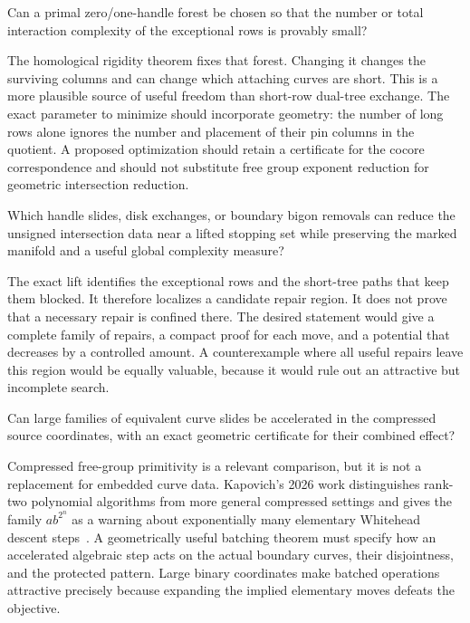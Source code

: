 \begin{question}
Can a primal zero/one-handle forest be chosen so that the number or total
interaction complexity of the exceptional rows is provably small?
\end{question}

The homological rigidity theorem fixes that forest. Changing it changes the
surviving columns and can change which attaching curves are short. This
is a more plausible source of useful freedom than short-row dual-tree
exchange. The exact parameter to minimize should incorporate geometry:
the number of long rows alone ignores the number and placement of their
pin columns in the quotient. A proposed optimization should retain a
certificate for the cocore correspondence and should not substitute free
group exponent reduction for geometric intersection reduction.

\begin{question}
Which handle slides, disk exchanges, or boundary bigon removals can reduce
the unsigned intersection data near a lifted stopping set while preserving
the marked manifold and a useful global complexity measure?
\end{question}

The exact lift identifies the exceptional rows and the short-tree paths
that keep them blocked. It therefore localizes a candidate repair region.
It does not prove that a necessary repair is confined there. The desired
statement would give a complete family of repairs, a compact proof for
each move, and a potential that decreases by a controlled amount. A
counterexample where all useful repairs leave this region would be equally
valuable, because it would rule out an attractive but incomplete search.

\begin{question}
Can large families of equivalent curve slides be accelerated in the
compressed source coordinates, with an exact geometric certificate for
their combined effect?
\end{question}

Compressed free-group primitivity is a relevant comparison, but it is not a
replacement for embedded curve data. Kapovich's 2026 work distinguishes
rank-two polynomial algorithms from more general compressed settings and
gives the family $ab^{2^n}$ as a warning about exponentially many elementary
Whitehead descent steps~\cite{kapovich2026}. A geometrically useful batching
theorem must specify how an accelerated algebraic step acts on the actual
boundary curves, their disjointness, and the protected pattern. Large binary
coordinates make batched operations attractive precisely because expanding
the implied elementary moves defeats the objective.

